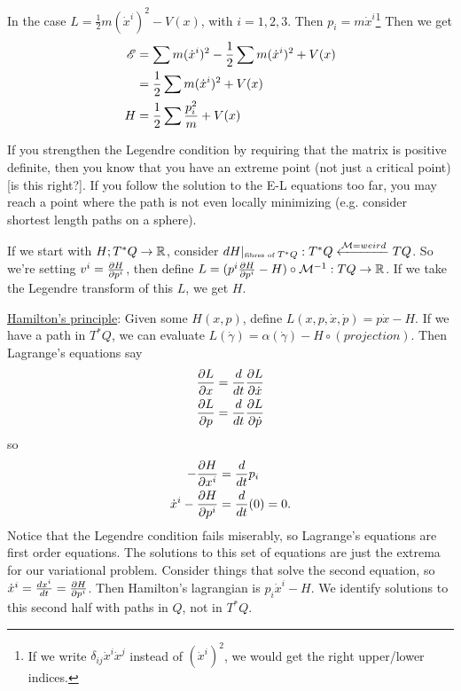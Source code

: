  In the case $L=\frac{1}{2}m(\dot{x}^i)^2 - V(x)$, with $i=1,2,3$. Then
 $p_i=m\dot{x}^i$\footnote{If we write $\delta_{ij}\dot{x}^i\dot{x}^j$ instead of
 $(\dot{x}^i)^2$, we would get the right upper/lower indices.}  Then we
 get
 \begin{align*}
    \mathscr{E} &= \sum m(\dot{x}^i)^2 - \frac{1}{2}\sum m(\dot{x}^i)^2 + V(x) \\
     &= \frac{1}{2}\sum m(\dot{x}^i)^2 + V(x)\\
    H &= \frac{1}{2}\sum \frac{p_i^2}{m} + V(x)
 \end{align*}

 If you strengthen the Legendre condition by requiring that the
 matrix is positive definite, then you know that you have an
 extreme point (not just a critical point)[is this right?].  If
 you follow the solution to the E-L equations too far, you may
 reach a point where the path is not even locally minimizing (e.g.
 consider shortest length paths on a sphere).

 If we start with $H;T^*Q\to \mathbb{R}$, consider $dH|_{\text{\tiny
 fibres of }T^*Q}:T^*Q\xleftarrow{\mathcal{M}=weird} TQ$.  So
 we're setting $v^i = \frac{\partial H}{\partial p^i}$, then define
 $L=(p^i\frac{\partial H}{\partial p^i}-H)\circ \mathcal{M}^{-1}:TQ\to \mathbb{R}$.  If we
 take the Legendre transform of this $L$, we get $H$.

 \underline{Hamilton's principle}: Given some $H(x,p)$, define
 $L(x,p,\dot{x},\dot{p})= p\dot{x}-H$.  If we have a path in $T^*Q$, we can
 evaluate $L(\dot\gamma)=\alpha(\dot\gamma)-H\circ (projection)$.  Then
 Lagrange's equations say
 \begin{align*}
   \frac{\partial L}{\partial x} &= \frac{d }{d t} \frac{\partial L}{\partial \dot{x}}\\
   \frac{\partial L}{\partial p} &= \frac{d }{d t} \frac{\partial L}{\partial \dot{p}}
 \end{align*}
 so
 \begin{align*}
   -\frac{\partial H}{\partial x^i} &= \frac{d }{d t} p_i\\
   \dot{x}^i-\frac{\partial H}{\partial p^i} &= \frac{d }{d t}(0)=0.
 \end{align*}
 Notice that the Legendre condition fails miserably, so Lagrange's
 equations are first order equations. The solutions to this set of
 equations are just the extrema for our variational problem.
 Consider things that solve the second equation, so $\dot{x}^i=\frac{d x^i}{d t}
 = \frac{\partial H}{\partial p^i}$.  Then Hamilton's lagrangian is $p_i\dot{x}^i-H$.  We
 identify solutions to this second half with paths in $Q$, not in
 $T^*Q$.
